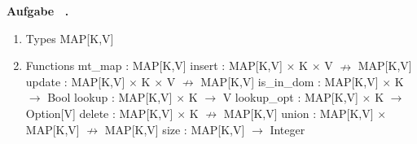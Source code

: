 \documentclass[a4paper,11pt]{article}             %
\def\vblatt{~}
\newcounter{aufgabe}
\newcommand{\Aufgabe}{\noindent\newline\addtocounter{aufgabe}{1}\textbf{Aufgabe \vblatt.\theaufgabe}\\
}
\begin{document}
\Aufgabe
\begin{enumerate}
\item Types
\subitem MAP[K,V]
\item Functions
\subitem mt\_map : MAP[K,V]
\subitem insert : MAP[K,V] $\times$ K $\times$ V $\nrightarrow$ MAP[K,V]
\subitem update : MAP[K,V] $\times$ K $\times$ V $\nrightarrow$ MAP[K,V]
\subitem is\_in\_dom : MAP[K,V] $\times$ K $\rightarrow$ Bool
\subitem lookup : MAP[K,V] $\times$ K $\rightarrow$ V
\subitem lookup\_opt : MAP[K,V] $\times$ K $\rightarrow$ Option[V]
\subitem delete : MAP[K,V] $\times$ K $\nrightarrow$ MAP[K,V]
\subitem union : MAP[K,V] $\times$ MAP[K,V] $\nrightarrow$ MAP[K,V]
\subitem size : MAP[K,V] $\rightarrow$ Integer
\subitem 
\end{enumerate}
\end{document}
